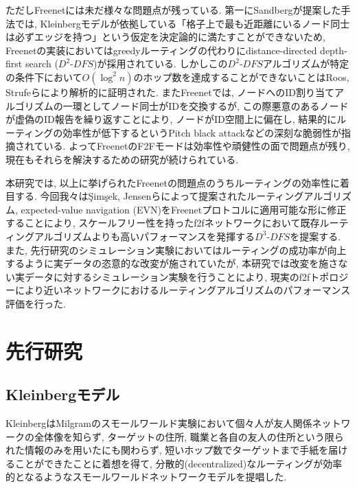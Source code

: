 \documentclass[dvipdfmx]{ampbt}
\begin{document}
ただしFreenetには未だ様々な問題点が残っている. 第一にSandbergが提案した手法では, Kleinbergモデルが依拠している「格子上で最も近距離にいるノード同士は必ずエッジを持つ」という仮定を決定論的に満たすことができないため, Freenetの実装においてはgreedyルーティングの代わりにdistance-directed depth-first search ($D^2$-$DFS$)が採用されている. しかしこの$D^2$-$DFS$アルゴリズムが特定の条件下において$O(\log^2 n)$のホップ数を達成することができないことはRoos, Strufeらにより解析的に証明された\cite{roos2012provable}\cite{roos2016dealing}\cite{roos2016analyzing}. またFreenetでは, ノードへのID割り当てアルゴリズムの一環としてノード同士がIDを交換するが, この際悪意のあるノードが虚偽のID報告を繰り返すことにより, ノードがID空間上に偏在し, 結果的にルーティングの効率性が低下するというPitch black attack\cite{evans2007routing}などの深刻な脆弱性が指摘されている. よってFreenetのF2Fモードは効率性や頑健性の面で問題点が残り, 現在もそれらを解決するための研究が続けられている.

本研究では, 以上に挙げられたFreenetの問題点のうちルーティングの効率性に着目する. 今回我々は{\c{S}}im{\c{s}}ek, Jensenらによって提案されたルーティングアルゴリズム, expected-value navigation (EVN)\cite{simsek2008navigating}をFreenetプロトコルに適用可能な形に修正することにより, スケールフリー性を持った\acrshort{f2f}ネットワークにおいて既存ルーティングアルゴリズムよりも高いパフォーマンスを発揮する$D^3$-$DFS$を提案する. また, 先行研究のシミュレーション実験においてはルーティングの成功率が向上するように実データの恣意的な改変が施されていたが, 本研究では改変を施さない実データに対するシミュレーション実験を行うことにより, 現実の\acrshort{f2f}トポロジーにより近いネットワークにおけるルーティングアルゴリズムのパフォーマンス評価を行った.

 \section{先行研究}
   \subsection{Kleinbergモデル} \label{sec:kleinberg}
   KleinbergはMilgramのスモールワールド実験において個々人が友人関係ネットワークの全体像を知らず, ターゲットの住所, 職業と各自の友人の住所という限られた情報のみを用いたにも関わらず, 短いホップ数でターゲットまで手紙を届けることができたことに着想を得て, 分散的(decentralized)なルーティングが効率的となるようなスモールワールドネットワークモデルを提唱した\cite{kleinberg2000small}.
\end{document}
